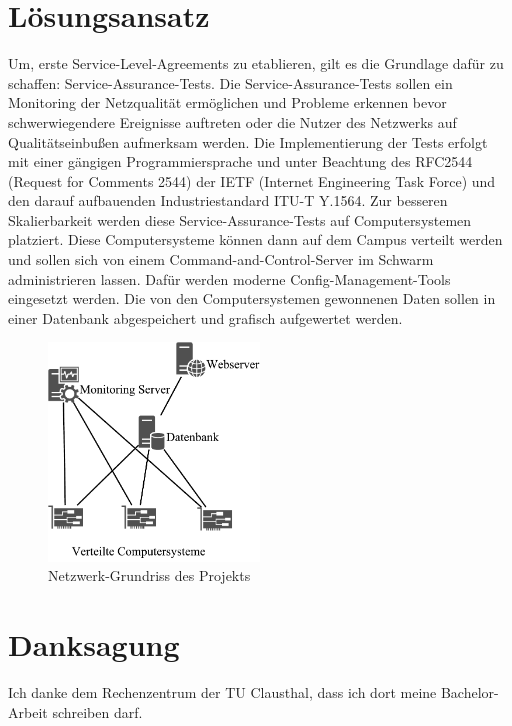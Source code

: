 \documentclass[conference]{IEEEtran}
\begin{document}
\section*{Lösungsansatz}
Um, erste Service-Level-Agreements zu etablieren, gilt es die Grundlage
dafür zu schaffen: Service-Assurance-Tests. Die Service-Assurance-Tests
sollen ein Monitoring der Netzqualität ermöglichen und Probleme erkennen
bevor schwerwiegendere Ereignisse auftreten oder die Nutzer des
Netzwerks auf Qualitätseinbußen aufmerksam werden. Die Implementierung
der Tests erfolgt mit einer gängigen Programmiersprache und unter
Beachtung des RFC2544 (Request for Comments 2544) der IETF (Internet
Engineering Task Force) und den darauf aufbauenden Industriestandard
ITU-T Y.1564.  Zur besseren Skalierbarkeit werden diese
Service-Assurance-Tests auf Computersystemen platziert. Diese
Computersysteme können dann auf dem Campus verteilt werden und
sollen sich von einem Command-and-Control-Server im Schwarm
administrieren lassen. Dafür werden moderne Config-Management-Tools
eingesetzt werden. Die von den Computersystemen gewonnenen Daten
sollen in einer Datenbank abgespeichert und grafisch aufgewertet werden.
\begin{figure}[h]
    \centering
    \includegraphics[width=0.5\textwidth]{figures/network.pdf}
    \caption{Netzwerk-Grundriss des Projekts}\label{fig:1}
\end{figure}

\section*{Danksagung}
Ich danke dem Rechenzentrum der TU Clausthal, dass ich dort meine
Bachelor-Arbeit schreiben darf.
\end{document}
